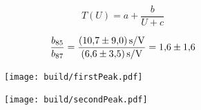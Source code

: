 \begin{equation}
	T(U) = a + \frac{b}{U + c}
\end{equation}

\begin{equation}
	\frac{b_{85}}{b_{87}} =
	\frac{\SI{10.7+-9.0}{\second\per\volt}}{\SI{6.6+-3.5}{\second\per\volt}} = \num{1.6 +- 1.6}
\end{equation}

\begin{figure}[h]
	\centering
	\begin{subfigure}[c]{0.45\textwidth}
	\begin{center}
		\texttt{[image: build/firstPeak.pdf]}
	\end{center}
	\caption{}
	\label{fig:}
	\end{subfigure}
	\begin{subfigure}[c]{0.45\textwidth}
	\begin{center}
	\texttt{[image: build/secondPeak.pdf]}
	\end{center}
	\caption{}
	\label{fig:}
	\end{subfigure}
	\caption{}
	\label{fig:}
\end{figure}


